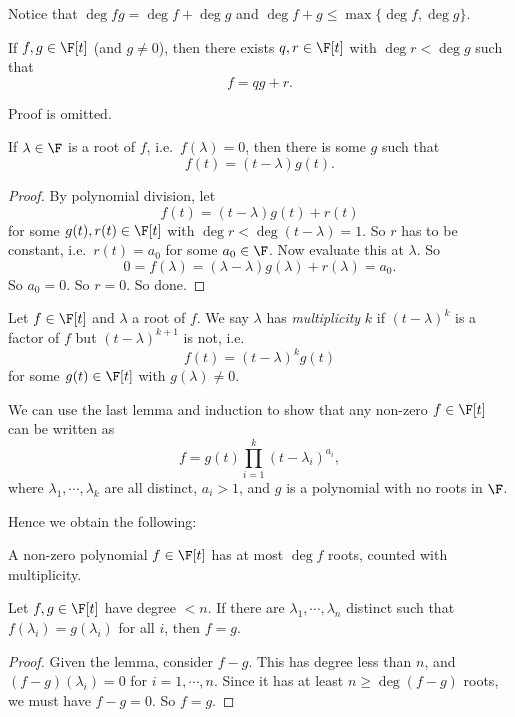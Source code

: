 \documentclass[a4paper]{article}
\begin{document}
Notice that $\deg fg = \deg f + \deg g$ and $\deg f + g \leq \max\{\deg f, \deg g\}$.

\begin{lemma}
  If $f, g \in \F[t]$ (and $g \not= 0$), then there exists $q, r \in \F[t]$ with $\deg r < \deg g$ such that
  \[
    f = qg + r.
  \]
\end{lemma}
Proof is omitted.

\begin{lemma}
  If $\lambda \in \F$ is a root of $f$, i.e.\ $f(\lambda) = 0$, then there is some $g$ such that
  \[
    f(t) = (t - \lambda) g(t).
  \]
\end{lemma}

\begin{proof}
  By polynomial division, let
  \[
    f(t) = (t - \lambda)g(t) + r(t)
  \]
  for some $g(t), r(t) \in \F[t]$ with $\deg r < \deg (t - \lambda) = 1$. So $r$ has to be constant, i.e.\ $r(t) = a_0$ for some $a_0 \in \F$. Now evaluate this at $\lambda$. So
  \[
    0 = f(\lambda) = (\lambda - \lambda)g(\lambda) + r(\lambda) = a_0.
  \]
  So $a_0 = 0$. So $r = 0$. So done.
\end{proof}

\begin{defi}
  Let $f \in \F[t]$ and $\lambda$ a root of $f$. We say $\lambda$ has \emph{multiplicity} $k$ if $(t - \lambda)^k$ is a factor of $f$ but $(t - \lambda)^{k + 1}$ is not, i.e.
  \[
    f(t) = (t - \lambda)^k g(t)
  \]
  for some $g(t) \in \F[t]$ with $g(\lambda) \not= 0$.
\end{defi}

We can use the last lemma and induction to show that any non-zero $f \in \F[t]$ can be written as
\[
  f = g(t) \prod_{i = 1}^k (t - \lambda_i)^{a_i},
\]
where $\lambda_1, \cdots, \lambda_k$ are all distinct, $a_i > 1$, and $g$ is a polynomial with no roots in $\F$.

Hence we obtain the following:
\begin{lemma}
  A non-zero polynomial $f \in \F[t]$ has at most $\deg f$ roots, counted with multiplicity.
\end{lemma}

\begin{cor}
  Let $f, g \in \F[t]$ have degree $<n$. If there are $\lambda_1, \cdots, \lambda_n$ distinct such that $f(\lambda_i) = g(\lambda_i)$ for all $i$, then $f = g$.
\end{cor}

\begin{proof}
  Given the lemma, consider $f - g$. This has degree less than $n$, and $(f - g)(\lambda_i) = 0$ for $i = 1, \cdots, n$. Since it has at least $n \geq \deg(f - g)$ roots, we must have $f - g = 0$. So $f = g$.
\end{proof}
\end{document}
